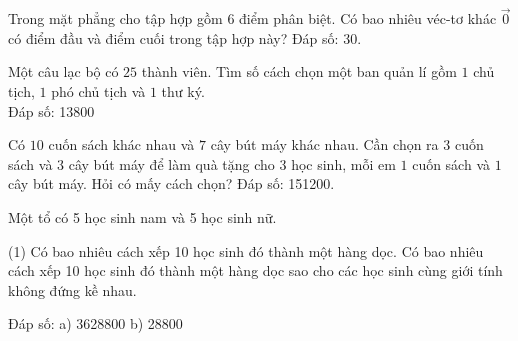 \begin{baitap}
	Trong mặt phẳng cho tập hợp gồm $6$ điểm phân biệt. Có bao nhiêu véc-tơ khác $\vec{0}$ có điểm đầu và điểm cuối trong tập hợp này?
	\hspace*{8cm} {\sf\fontsize{10pt}{1pt}\color{blue}\selectfont Đáp số: 30.}
\end{baitap} 

\begin{baitap}
	Một câu lạc bộ có $25$ thành viên. Tìm số cách chọn một ban quản lí gồm $1$ chủ tịch, $1$ phó chủ tịch và $1$ thư ký.\\
	\hspace*{6cm} {\sf\fontsize{10pt}{1pt}\color{blue}\selectfont Đáp số: 13800}
\end{baitap} 


\begin{baitap}
	Có $10$ cuốn sách khác nhau và $7$ cây bút máy khác nhau. Cần chọn ra $3$ cuốn sách và $3$ cây bút máy để làm quà tặng cho $3$ học sinh, mỗi em $1$ cuốn sách và $1$ cây bút máy. Hỏi có mấy cách chọn?
	\hspace*{8cm} {\sf\fontsize{10pt}{1pt}\color{blue}\selectfont Đáp số: 151200.}
\end{baitap} 


\begin{baitap}%
	Một tổ có 5 học sinh nam và 5 học sinh nữ.
	\begin{tasks}(1)
		\task Có bao nhiêu cách xếp 10 học sinh đó thành một hàng dọc.
		\task Có bao nhiêu cách xếp 10 học sinh đó thành một hàng dọc sao cho các học sinh cùng giới tính không đứng kề nhau.
	\end{tasks}
	\hspace*{8cm} {\sf\fontsize{10pt}{1pt}\color{blue}\selectfont Đáp số: a) 3628800 \quad b) 28800 }
\end{baitap} 

